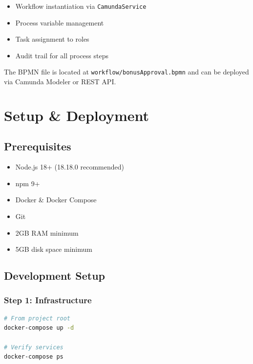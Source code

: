 \documentclass[11pt,a4paper,oneside,openany]{book}
\newcommand{\note}[1]{\begin{tcolorbox}[colback=blue!5!white,colframe=darkblue,title=Note]\small #1\end{tcolorbox}}
\newcommand{\code}[1]{\texttt{\small #1}}
\begin{document}
\begin{itemize}
    \item Workflow instantiation via \code{CamundaService}
    \item Process variable management
    \item Task assignment to roles
    \item Audit trail for all process steps
\end{itemize}

\note{The BPMN file is located at \code{workflow/bonusApproval.bpmn} and can be deployed via Camunda Modeler or REST API.}

\chapter{Setup \& Deployment}

\section{Prerequisites}

\begin{tcolorbox}[colback=background,colframe=darkblue,title=System Requirements]
\begin{itemize}
    \item Node.js 18+ (18.18.0 recommended)
    \item npm 9+
    \item Docker \& Docker Compose
    \item Git
    \item 2GB RAM minimum
    \item 5GB disk space minimum
\end{itemize}
\end{tcolorbox}

\section{Development Setup}

\subsection{Step 1: Infrastructure}

\begin{lstlisting}[language=bash,caption=Start MongoDB and Camunda]
# From project root
docker-compose up -d

# Verify services
docker-compose ps
\end{lstlisting}
\end{document}
